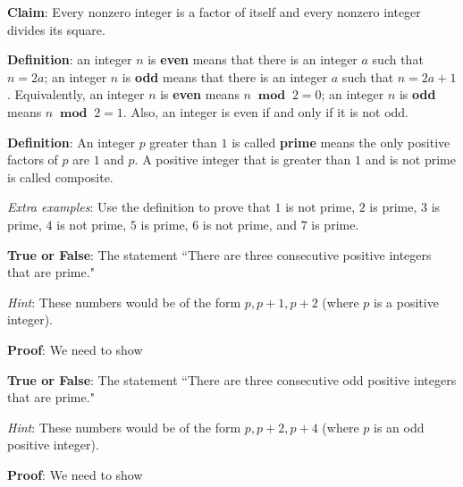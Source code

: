 \documentclass[12pt, oneside]{article}
\begin{document}
{\bf Claim}: Every nonzero integer is a factor of itself and 
every nonzero integer divides its square.

\vfill \newpage


{\bf Definition}: an integer $n$ is {\bf even} means that there is an integer $a$ such that $n = 2a$; 
an integer $n$ is {\bf odd} means that there is an integer $a$ such that $n = 2a+1$.  Equivalently, 
an integer $n$ is {\bf even} means $n ~\textbf{ mod }~2 = 0$; an integer $n$ is {\bf odd} means $n ~\textbf{ mod }~2 = 1$.  
Also, an integer is even if and only if it is not odd.
 

{\bf Definition}:  An integer $p$ greater than $1$ is called {\bf prime} means 
the only positive factors of 
$p$ are $1$ and $p$. A positive integer that is greater than $1$ and is not prime 
is called composite. 

{\it Extra examples}: Use the definition to prove that $1$ is not prime, $2$ is prime, $3$
is prime, $4$ is not prime, $5$ is prime, $6$ is not prime, and $7$ is prime.


{\bf True or False}: The statement ``There are three consecutive positive integers that are prime."

{\it Hint}: These numbers would be of the form $p, p+1, p+2$ (where $p$ is a positive integer).

{\bf Proof}: We need to show \underline{}

\vspace{200pt}

{\bf True or False}: The statement ``There are three consecutive odd positive integers that are prime."

{\it Hint}: These numbers would be of the form $p, p+2, p+4$ (where $p$ is an odd positive integer).

{\bf Proof}: We need to show \underline{}

\vspace{200pt}
 
\end{document}
